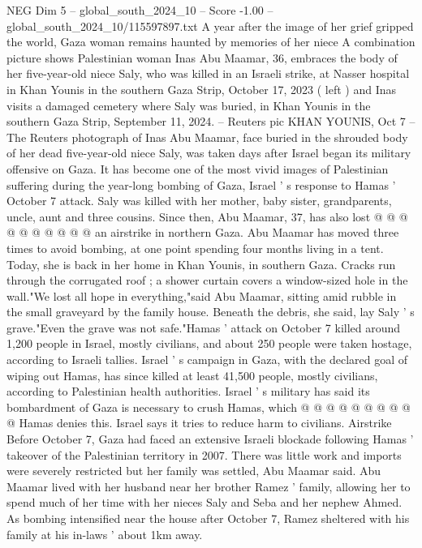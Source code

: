 \begin{textsample}{NEG Dim 5 – global\_south\_2024\_10 – Score -1.00 – global\_south\_2024\_10/115597897.txt}  \label{ex:f5_neg_132}
A year after the image of her grief gripped the world, Gaza woman remains haunted by memories of her niece A combination picture shows Palestinian woman Inas Abu Maamar, 36, embraces the body of her five-year-old niece Saly, who was killed in an Israeli strike, at Nasser hospital in Khan Younis in the southern Gaza Strip, October 17, 2023 ( left ) and Inas visits a damaged cemetery where Saly was buried, in Khan Younis in the southern Gaza Strip, September 11, 2024. -- Reuters pic KHAN YOUNIS, Oct 7 -- The Reuters photograph of Inas Abu Maamar, face buried in the shrouded body of her dead five-year-old niece Saly, was taken days after Israel began its military offensive on Gaza.
It has become one of the most vivid images of Palestinian suffering during the year-long bombing of Gaza, Israel ' s response to Hamas ' October 7 attack.
Saly was killed with her mother, baby sister, grandparents, uncle, aunt and three cousins.
Since then, Abu Maamar, 37, has also lost @ @ @ @ @ @ @ @ @ @ an airstrike in northern Gaza.
Abu Maamar has moved three times to avoid bombing, at one point spending four months living in a tent.
Today, she is back in her home in Khan Younis, in southern Gaza.
Cracks run through the corrugated roof ; a shower curtain covers a window-sized hole in the wall."We lost all hope in everything,"said Abu Maamar, sitting amid rubble in the small graveyard by the family house.
Beneath the debris, she said, lay Saly ' s grave."Even the grave was not safe."Hamas ' attack on October 7 killed around 1,200 people in Israel, mostly civilians, and about 250 people were taken hostage, according to Israeli tallies.
Israel ' s campaign in Gaza, with the declared goal of wiping out Hamas, has since killed at least 41,500 people, mostly civilians, according to Palestinian health authorities.
Israel ' s military has said its bombardment of Gaza is necessary to crush Hamas, which @ @ @ @ @ @ @ @ @ @ Hamas denies this.
Israel says it tries to reduce harm to civilians.
Airstrike Before October 7, Gaza had faced an extensive Israeli blockade following Hamas ' takeover of the Palestinian territory in 2007.
There was little work and imports were severely restricted but her family was settled, Abu Maamar said.
Abu Maamar lived with her husband near her brother Ramez ' family, allowing her to spend much of her time with her nieces Saly and Seba and her nephew Ahmed.
As bombing intensified near the house after October 7, Ramez sheltered with his family at his in-laws ' about 1km away.

\end{textsample}
